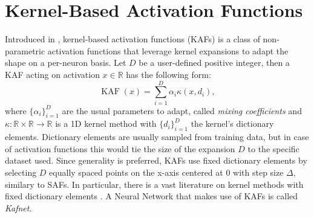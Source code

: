 \documentclass[LaM,binding=0.6cm]{./packages/sapthesis/sapthesis}
\begin{document}
    \section{Kernel-Based Activation Functions}
    Introduced in \cite{kafnets}, kernel-based activation functions (KAFs) is a class of non-parametric activation functions that leverage kernel expansions to adapt the shape on a per-neuron basis.
    Let $D$ be a user-defined positive integer, then a KAF acting on activation $x \in \mathbb{R} $ has the following form:
    \begin{equation}
        \operatorname{KAF} (x) = \sum_{i=1}^{D} \alpha_{i} \kappa\left(x, d_{i}\right),
    \end{equation}
    where $\{ \alpha_i\}_{i=1}^D $ are the usual parameters to adapt, called \textit{mixing coefficients} and $\kappa \colon \mathbb{R} \times \mathbb{R} \to \mathbb{R}$ is a 1D kernel method with  
    $\{ d_i\}_{i=1}^D $ the kernel's dictionary elements. Dictionary elements are usually sampled from training data, but in case of activation functions 
    this would tie the size of the expansion $D$ to the specific dataset used. Since generality is preferred, KAFs use fixed dictionary elements by selecting
    $D$ equally spaced points on the x-axis centered at 0 with step size $\Delta$, similary to SAFs. In particular, there is a vast literature on kernel methods with fixed dictionary elements \cite{gaussianproc}.
    A Neural Network that makes use of KAFs is called \textit{Kafnet}.
\end{document}
